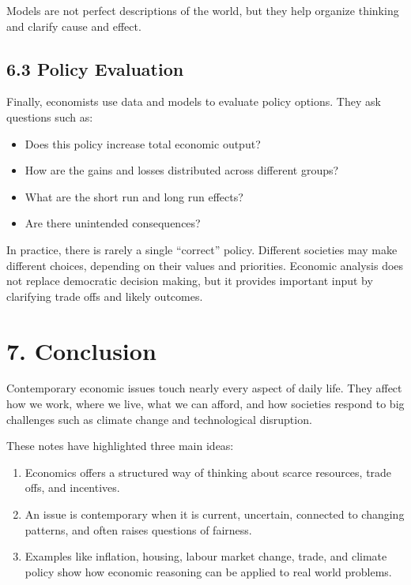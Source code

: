 \documentclass[12pt]{article}
\begin{document}
Models are not perfect descriptions of the world, but they help organize thinking and clarify cause and effect.

\newpage

\subsection*{6.3 Policy Evaluation}

Finally, economists use data and models to evaluate policy options. They ask questions such as:

\begin{itemize}[noitemsep]
    \item Does this policy increase total economic output?
    \item How are the gains and losses distributed across different groups?
    \item What are the short run and long run effects?
    \item Are there unintended consequences?
\end{itemize}

In practice, there is rarely a single ``correct'' policy. Different societies may make different choices, depending on their values and priorities. Economic analysis does not replace democratic decision making, but it provides important input by clarifying trade offs and likely outcomes.

\section*{7. Conclusion}

Contemporary economic issues touch nearly every aspect of daily life. They affect how we work, where we live, what we can afford, and how societies respond to big challenges such as climate change and technological disruption.

These notes have highlighted three main ideas:

\begin{enumerate}[noitemsep]
    \item Economics offers a structured way of thinking about scarce resources, trade offs, and incentives.
    \item An issue is contemporary when it is current, uncertain, connected to changing patterns, and often raises questions of fairness.
    \item Examples like inflation, housing, labour market change, trade, and climate policy show how economic reasoning can be applied to real world problems.
\end{enumerate}
\end{document}
